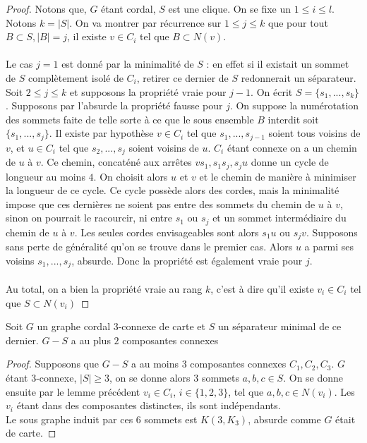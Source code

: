 \documentclass{scrartcl}
\begin{document}
\begin{flushleft}
\begin{proof}
    Notons que, $G$ étant cordal, $S$ est une clique. On se fixe un $1 \leq i \leq l$.
    Notons $k = |S|$. On va montrer par récurrence sur $1 \leq j \leq k$ que pour tout $B \subset S, |B| = j$,
    il existe $v \in C_i$ tel que $B \subset N(v)$.
    \\~\\
    Le cas $j = 1$ est donné par la minimalité de $S$ : en effet si il existait un sommet de $S$ complètement isolé de $C_i$, retirer
    ce dernier de $S$ redonnerait un séparateur.\\
    Soit $2 \leq j \leq k$ et supposons la propriété vraie pour $j-1$. On écrit $S = \{s_1, ..., s_k\}$. Supposons par l'absurde la propriété
    fausse pour $j$. On suppose la numérotation des sommets faite de telle sorte à ce que le sous ensemble $B$ interdit soit
    $\{s_1, ..., s_j\}$. Il existe par hypothèse $v \in C_i$ tel que $s_1, ..., s_{j-1}$ soient tous voisins de $v$, et $u \in C_i$ tel que
    $s_2, ..., s_j$ soient voisins de $u$. $C_i$ étant connexe on a un chemin de $u$ à $v$. Ce chemin, concaténé aux arrêtes $vs_1, s_1 s_j, s_j u$
    donne un cycle de longueur au moins $4$. On choisit alors $u$ et $v$ et le chemin de manière à minimiser la longueur de ce cycle.
    Ce cycle possède alors des cordes, mais la minimalité impose que ces dernières ne soient pas entre des sommets du chemin de $u$ à $v$,
    sinon on pourrait le racourcir, ni entre $s_1$ ou $s_j$ et un sommet intermédiaire du chemin de $u$ à $v$. Les seules cordes envisageables
    sont alors $s_1u$ ou $s_jv$. Supposons sans perte de généralité qu'on se trouve dans le premier cas. Alors $u$ a parmi ses voisins
    $s_1, ..., s_j$, absurde. Donc la propriété est également vraie pour $j$.
    \\~\\
    Au total, on a bien la propriété vraie au rang $k$, c'est à dire qu'il existe $v_i \in C_i$ tel que $S \subset N(v_i)$
\end{proof}

\begin{cor}
    Soit $G$ un graphe cordal $3$-connexe de carte et $S$ un séparateur minimal de ce dernier. $G - S$ a au plus $2$ composantes
    connexes
\end{cor}

\begin{proof}
    Supposons que $G - S$ a au moins $3$ composantes connexes $C_1, C_2, C_3$. $G$ étant $3$-connexe, $|S| \geq 3$, on se donne
    alors $3$ sommets $a,b,c \in S$. On se donne ensuite par le lemme précédent $v_i \in C_i$, $i \in \{1,2,3\}$, tel que
    $a,b,c \in N(v_i)$. Les $v_i$ étant dans des composantes distinctes, ils sont indépendants.\\
    Le sous graphe induit par ces $6$ sommets est $K(3, K_3)$, absurde comme $G$ était de carte.
\end{proof}


\end{flushleft}
\end{document}
